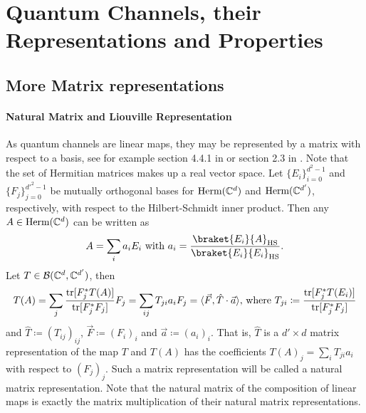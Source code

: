 \chapter{Quantum Channels, their Representations and Properties} \label{ch:3_preliminaries_channels}
\section{More Matrix representations}
\subsubsection{Natural Matrix and Liouville Representation}\label{sec:matrix-rep}
As quantum channels are linear maps, they may be represented by a matrix with respect to a basis, see for example section 4.4.1 in \cite{heinosaariMathematicalLanguageQuantum2011} or section 2.3 in \cite{wolf2012quantum}. Note that the set of Hermitian matrices makes up a real vector space. Let $\{E_i\}_{i=0}^{d^2-1}$ and $\{F_j\}_{j=0}^{d'^2-1}$ be mutually orthogonal bases for $\text{Herm}(\mathbb{C}^d)$ and $\text{Herm}(\mathbb{C}^{d'})$, respectively, with respect to the Hilbert-Schmidt inner product. Then any $A \in \text{Herm}(\mathbb{C}^d)$ can be written as 
\begin{align}
    A = \sum_i a_i E_i \text{ with }a_i = \frac{\braket{E_i}{A}_\text{HS}}{\braket{E_i}{E_i}_\text{HS}}.\label{eq:vector-represen}
\end{align}
Let $T \in \mathcal B(\mathbb{C}^d,\mathbb{C}^{d'})$, then
\begin{align}\label{eq:bloch-trafo}
    T(A) = \sum_j \frac{\mathrm{tr}[F_j^*T(A)]}{\mathrm{tr}[F_j^*F_j]}F_j   = \sum_{ij}T_{ji} a_iF_j = \langle \Vec{F}, \hat T\cdot \vec a\rangle \text{, where }T_{ji}\coloneqq \frac{\mathrm{tr}[F_j^*T(E_i)]}{\mathrm{tr}[F_j^*F_j]}
\end{align}
and $\hat T\coloneqq (T_{ij})_{ij}$, $\vec F\coloneqq (F_i)_i$ and $\vec a \coloneqq (a_i)_i$. That is, $\hat T$ is a $d'\times d$ matrix representation of the map $T$ and $T(A)$ has the coefficients $T(A)_j = \sum_i T_{ji}a_i$ with respect to $(F_j)_j$. Such a matrix representation will be called a natural matrix representation. Note that the natural matrix of the composition of linear maps is exactly the matrix multiplication of their natural matrix representations.


